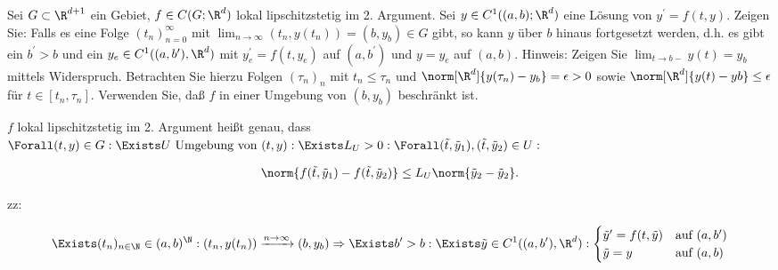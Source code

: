 \begin{exercise}

Sei $G \subset \R^{d+1}$ ein Gebiet, $f \in C(G; \R^d)$ lokal lipschitzstetig im 2. Argument.
Sei $y \in C^1((a, b); \R^d)$ eine Lösung von $y^\prime = f(t, y)$.
Zeigen Sie:
Falls es eine Folge $(t_n)^\infty_{n=0}$ mit $\lim_{n \to \infty}(t_n, y(t_n)) = (b, y_b) \in G$ gibt, so kann $y$ über $b$ hinaus fortgesetzt werden, d.h. es gibt ein $b^\prime > b$ und ein $y_e \in C^1((a, b^\prime), \R^d)$ mit $y_e^\prime = f(t, y_e)$ auf $(a, b^\prime)$ und $y = y_e$ auf $(a, b)$.
Hinweis:
Zeigen Sie $\lim_{t \to b-} y(t) = y_b$ mittels Widerspruch.
Betrachten Sie hierzu Folgen $(\tau_n)_n$ mit $t_n \leq \tau_n$ und $\norm[\R^d]{y(\tau_n) - y_b} = \epsilon > 0$ sowie $\norm[\R^d]{y(t) - yb} \leq \epsilon$ für $t \in [t_n, \tau_n]$.
Verwenden Sie, daß $f$ in einer Umgebung von $(b, y_b)$ beschränkt ist.

\end{exercise}

\begin{solution}

$f$ lokal lipschitzstetig im 2. Argument heißt genau, dass
$\Forall (t, y) \in G:
\Exists U \text{ Umgebung von } (t, y):
\Exists L_U > 0:
\Forall (\tilde{t}, \tilde{y}_1), (\tilde{t}, \tilde{y}_2) \in U:$

\begin{align*}
  \norm{f(\tilde{t}, \tilde{y}_1) - f(\tilde{t}, \tilde{y}_2)}
  \leq
  L_U \norm{\tilde{y}_2 - \tilde{y}_2}.
\end{align*}

zz:

\begin{align*}
  \Exists (t_n)_{n \in \N} \in (a, b)^\N:
  (t_n, y(t_n)) \xrightarrow{n \to \infty} (b, y_b)
  \Rightarrow
  \Exists b^\prime > b:
  \Exists \tilde{y} \in C^1((a, b^\prime), \R^d):
  \begin{cases}
    \tilde{y}^\prime = f(t, \tilde{y})
    & \text{auf } (a, b^\prime) \\
    \tilde{y} = y
    & \text{auf } (a, b)
  \end{cases}
\end{align*}

\end{solution}
